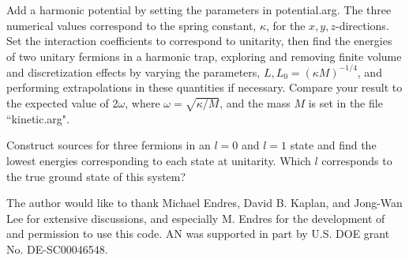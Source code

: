 \begin{prob}
 Add a harmonic potential by setting the parameters in potential.arg. The three numerical values correspond to the spring constant, $\kappa$, for the $x,y,z$-directions. Set the interaction coefficients to correspond to unitarity, then find the energies of two unitary fermions in a harmonic trap, exploring and removing finite volume and discretization effects by varying the parameters, $L,L_0=\left(\kappa M\right)^{-1/4}$, and performing extrapolations in these quantities if necessary. Compare your result to the expected value of 2$\omega$, where $\omega = \sqrt{\kappa/M}$, and the mass $M$ is set in the file ``kinetic.arg". 
\end{prob}

\begin{prob}
Construct sources for three fermions in an $l=0$ and $l=1$ state and find the lowest energies corresponding to each state at unitarity. Which $l$ corresponds to the true ground state of this system?
\end{prob}

\begin{acknowledgement}
The author would like to thank Michael Endres, David B. Kaplan, and Jong-Wan Lee for extensive discussions, and especially M. Endres for the development of and permission to use this code. AN was supported in part by U.S. DOE grant No. DE-SC00046548. 
\end{acknowledgement}








